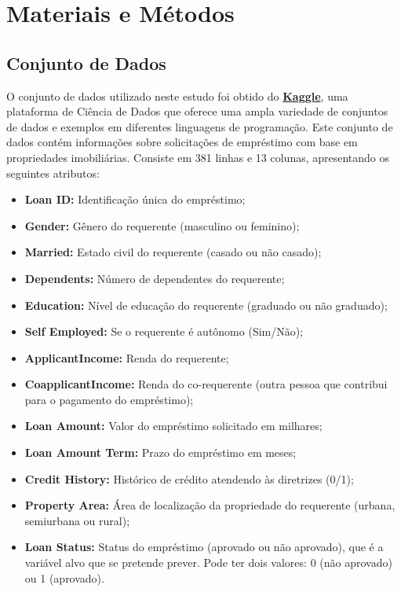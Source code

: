 \documentclass[a4paper,12pt]{article} %
\begin{document}
\section{Materiais e Métodos}
\subsection{Conjunto de Dados}
O conjunto de dados utilizado neste estudo foi obtido do \href{https://www.kaggle.com/datasets/bhavikjikadara/loan-status-prediction/data}{\textbf{Kaggle}}, uma plataforma de Ciência de Dados que oferece uma ampla variedade de conjuntos de dados e exemplos em diferentes linguagens de programação. Este conjunto de dados contém informações sobre solicitações de empréstimo com base em propriedades imobiliárias. Consiste em 381 linhas e 13 colunas, apresentando os seguintes atributos:

\begin{itemize}
    \item \textbf{Loan ID:} Identificação única do empréstimo;
    \item \textbf{Gender:} Gênero do requerente (masculino ou feminino);
    \item \textbf{Married:} Estado civil do requerente (casado ou não casado);
    \item \textbf{Dependents:} Número de dependentes do requerente;
    \item \textbf{Education:} Nível de educação do requerente (graduado ou não graduado);
    \item \textbf{Self Employed:} Se o requerente é autônomo (Sim/Não);
    \item \textbf{ApplicantIncome:} Renda do requerente;
    \item \textbf{CoapplicantIncome:} Renda do co-requerente (outra pessoa que contribui para o pagamento do empréstimo);
    \item \textbf{Loan Amount:} Valor do empréstimo solicitado em milhares;
    \item \textbf{Loan Amount Term:} Prazo do empréstimo em meses;
    \item \textbf{Credit History:} Histórico de crédito atendendo às diretrizes (0/1);
    \item \textbf{Property Area:} Área de localização da propriedade do requerente (urbana, semiurbana ou rural);
    \item \textbf{Loan Status:} Status do empréstimo (aprovado ou não aprovado), que é a variável alvo que se pretende prever. Pode ter dois valores: 0 (não aprovado) ou 1 (aprovado).
\end{itemize}
\end{document}
